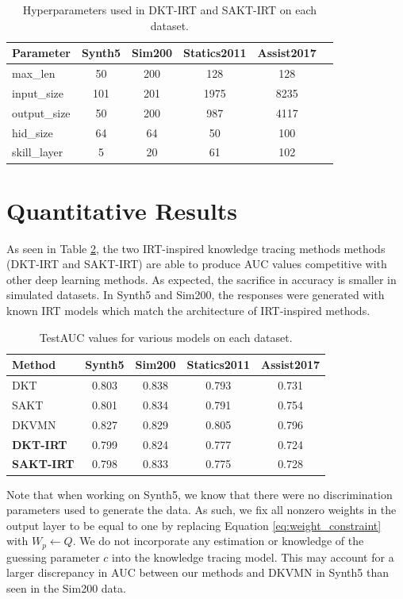 \begin{table}
  \centering
  \begin{tabular}{l c c c c c}
    \hline
    Parameter & Synth5 & Sim200 & Statics2011 & Assist2017 \\
    \hline
    max\_len & 50 & 200 & 128 & 128 \\
    input\_size & 101 & 201 & 1975 & 8235 \\
    output\_size & 50 & 200 & 987 & 4117 \\
    hid\_size & 64 & 64 & 50 & 100 \\
    skill\_layer & 5 & 20 & 61 & 102 
  \end{tabular}
  \caption{Hyperparameters used in DKT-IRT and SAKT-IRT on each dataset.}
  \label{tab:kt_params}
\end{table}

\section{Quantitative Results} \label{sec:kt_results}

As seen in Table \ref{tab:kt_results}, the two IRT-inspired knowledge tracing methods methods (DKT-IRT and SAKT-IRT) are able to produce AUC values competitive with other deep learning methods. As expected, the sacrifice in accuracy is smaller in simulated datasets. In Synth5 and Sim200, the responses were generated with known IRT models which match the architecture of IRT-inspired methods. 

\begin{table}
  \centering
  \begin{tabular}{l c c c c}
    \hline
    Method & Synth5 & Sim200 & Statics2011 & Assist2017 \\
    \hline 
    DKT & 0.803 & 0.838 & 0.793 & 0.731 \\
    SAKT & 0.801 & 0.834 & 0.791  & 0.754 \\
    DKVMN & 0.827 & 0.829 & 0.805 & 0.796 \\
    \textbf{DKT-IRT} & 0.799 & 0.824 & 0.777 & 0.724 \\
    \textbf{SAKT-IRT} & 0.798 & 0.833 & 0.775 & 0.728
  \end{tabular}
  \caption{TestAUC values for various models on each dataset.}
  \label{tab:kt_results}
\end{table}

Note that when working on Synth5, we know that there were no discrimination parameters used to generate the data. As such, we fix all nonzero weights in the output layer to be equal to one by replacing Equation \ref{eq:weight_constraint} with $W_p \gets Q$. We do not incorporate any estimation or knowledge of the guessing parameter $c$ into the knowledge tracing model. This may account for a larger discrepancy in AUC between our methods and DKVMN in Synth5 than seen in the Sim200 data.

